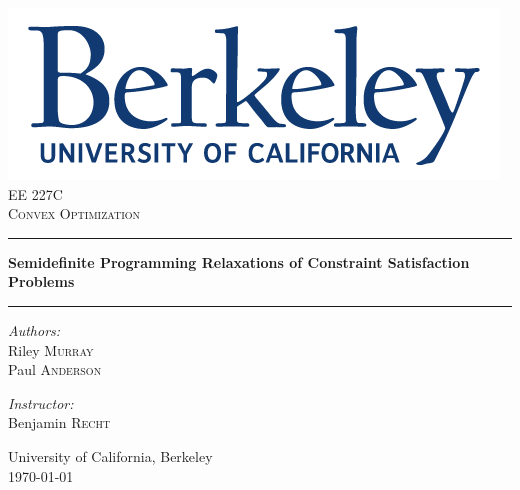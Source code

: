 \documentclass[11pt]{article} %
\begin{document}
\begin{titlepage}
	
	\begin{center}
		\vspace{10cm}
		
		\includegraphics[width=.5\textwidth]{./images/primarylogo}\\[3cm]    
		
		\normalsize EE 227C\\
		\textsc{\large Convex Optimization}\\[1cm]		
		
		\hrule 
		\vspace{1 cm}
		{ \Large \textbf{Semidefinite Programming Relaxations of Constraint Satisfaction Problems}\\[0.5cm]
			\vspace{0.5 cm}
			\hrule
			\vspace{1.5 cm}
			
			\begin{minipage}[t]{0.4\textwidth}
				\begin{flushleft} \large
					\emph{Authors:}\\
					\vspace{0.7ex}
					Riley \textsc{Murray} \\
					Paul \textsc{Anderson}
					
				\end{flushleft}
			\end{minipage}
			\begin{minipage}[t]{0.4\textwidth}
				\begin{flushright} \large
					\emph{Instructor:} \\
					\vspace{0.7ex}
					Benjamin \textsc{Recht}\\[0.3 cm]
				\end{flushright}
			\end{minipage}
			\vfill 
			University of California, Berkeley\\[.5cm]
			\large \today}
		
	\end{center}
	
\end{titlepage}
\end{document}
